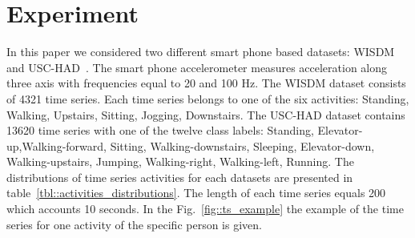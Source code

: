 \documentclass{llncs}
\begin{document}
\section{Experiment}
In this paper we considered two different smart phone based datasets: WISDM~\cite{wisdm} and USC-HAD~\cite{usc}. 
The smart phone accelerometer measures acceleration along three axis with frequencies equal to 20 and 100 Hz. 
The WISDM dataset consists of 4321 time series. Each time series belongs to one of the six activities: Standing, Walking, Upstairs, Sitting, Jogging, Downstairs. The USC-HAD dataset contains 13620 time series with one of the twelve class labels: Standing, Elevator-up,Walking-forward, Sitting, Walking-downstairs, Sleeping, Elevator-down, Walking-upstairs, Jumping, Walking-right, Walking-left, Running.
The distributions of time series activities for each datasets are presented in table~\ref{tbl::activities_distributions}. 
The length of each time series equals 200 which accounts 10 seconds. 
In the Fig.~\ref{fig::ts_example} the example of the time series for one activity of the specific person is given.
\end{document}
